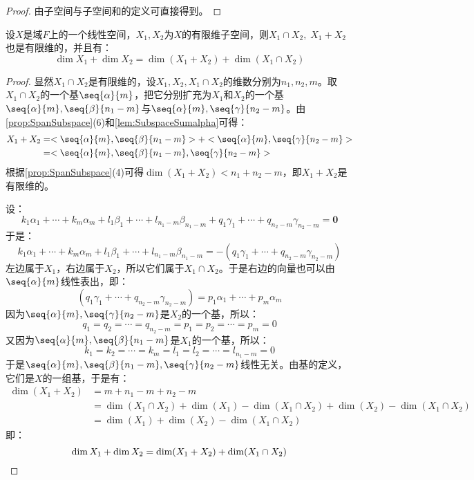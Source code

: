 \begin{proof}
	由子空间与子空间和的定义可直接得到。
\end{proof}
\begin{theorem}\label{theo:DimOfSubspace}
	设$X$是域$F$上的一个线性空间，$X_1,X_2$为$X$的有限维子空间，则$X_1\cap X_2,\;X_1+X_2$也是有限维的，并且有：
	\begin{equation*}
		\dim X_1+\dim X_2=\dim(X_1+X_2)+\dim(X_1\cap X_2)
	\end{equation*}
\end{theorem}
\begin{proof}
	显然$X_1\cap X_2$是有限维的，设$X_1,X_2,X_1\cap X_2$的维数分别为$n_1,n_2,m$。取$X_1\cap X_2$的一个基$\seq{\alpha}{m}$，把它分别扩充为$X_1$和$X_2$的一个基$\seq{\alpha}{m},\seq{\beta}{n_1-m}$与$\seq{\alpha}{m},\seq{\gamma}{n_2-m}$。由\cref{prop:SpanSubspace}(6)和\cref{lem:SubspaceSumalpha}可得：
	\begin{align*}
		X_1+X_2
		&=<\seq{\alpha}{m},\seq{\beta}{n_1-m}>+<\seq{\alpha}{m},\seq{\gamma}{n_2-m}> \\
		&=<\seq{\alpha}{m},\seq{\beta}{n_1-m},\seq{\gamma}{n_2-m}>
	\end{align*}
	根据\cref{prop:SpanSubspace}(4)可得$\operatorname{dim}(X_1+X_2)<n_1+n_2-m$，即$X_1+X_2$是有限维的。\par
	设：
	\begin{equation*}
		k_1\alpha_1+\cdots+k_m\alpha_m+l_1\beta_1+\cdots+l_{n_1-m}\beta_{n_1-m}+q_1\gamma_1+\cdots+q_{n_2-m}\gamma_{n_2-m}=\mathbf{0}
	\end{equation*}
	于是：
	\begin{equation*}
		k_1\alpha_1+\cdots+k_m\alpha_m+l_1\beta_1+\cdots+l_{n_1-m}\beta_{n_1-m}=-(q_1\gamma_1+\cdots+q_{n_2-m}\gamma_{n_2-m})
	\end{equation*}
	左边属于$X_1$，右边属于$X_2$，所以它们属于$X_1\cap X_2$。于是右边的向量也可以由$\seq{\alpha}{m}$线性表出，即：
	\begin{equation*}
		(q_1\gamma_1+\cdots+q_{n_2-m}\gamma_{n_2-m})=p_1\alpha_1+\cdots+p_m\alpha_m
	\end{equation*}
	因为$\seq{\alpha}{m},\seq{\gamma}{n_2-m}$是$X_2$的一个基，所以：
	\begin{equation*}
		q_1=q_2=\cdots=q_{n_2-m}=p_1=p_2=\cdots=p_m=0
	\end{equation*}
	又因为$\seq{\alpha}{m},\seq{\beta}{n_1-m}$是$X_1$的一个基，所以：
	\begin{equation*}
		k_1=k_2=\cdots=k_m=l_1=l_2=\cdots=l_{n_1-m}=0
	\end{equation*}
	于是$\seq{\alpha}{m},\seq{\beta}{n_1-m},\seq{\gamma}{n_2-m}$线性无关。由基的定义，它们是$X$的一组基，于是有：
	\begin{align*}
		\dim(X_1+X_2)
		&=m+n_1-m+n_2-m \\
		&=\dim(X_1\cap X_2)+\dim(X_1)-\dim(X_1\cap X_2)+\dim(X_2)-\dim(X_1\cap X_2) \\
		&=\dim(X_1)+\dim(X_2)-\dim(X_1\cap X_2)
	\end{align*}
	即：
	\begin{equation*}
		\dim X_1+\dim X_2=\dim(X_1+X_2)+\dim(X_1\cap X_2)\qedhere
	\end{equation*}
\end{proof}
